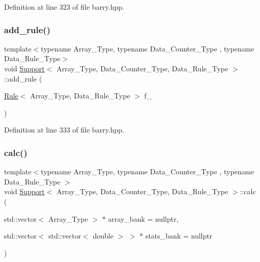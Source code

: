 Definition at line 323 of file barry.\+hpp.

\mbox{\label{classbarry_1_1_support_aa817cb5d6c48dda3ecfeef2c5897b537}} 
\subsubsection{\texorpdfstring{add\+\_\+rule()}{add\_rule()}\hspace{0.1cm}{\footnotesize\ttfamily [2/2]}}
{\footnotesize\ttfamily template$<$typename Array\+\_\+\+Type, typename Data\+\_\+\+Counter\+\_\+\+Type , typename Data\+\_\+\+Rule\+\_\+\+Type$>$ \\
void \hyperlink{classbarry_1_1_support}{Support}$<$ Array\+\_\+\+Type, Data\+\_\+\+Counter\+\_\+\+Type, Data\+\_\+\+Rule\+\_\+\+Type $>$\+::add\+\_\+rule (\begin{DoxyParamCaption}\item[{\hyperlink{classbarry_1_1_rule}{Rule}$<$ Array\+\_\+\+Type, Data\+\_\+\+Rule\+\_\+\+Type $>$}]{f\+\_\+ }\end{DoxyParamCaption})\hspace{0.3cm}{\ttfamily [inline]}}



Definition at line 333 of file barry.\+hpp.

\mbox{\label{classbarry_1_1_support_afa36b8c1348e28c51296379157f58081}} 
\subsubsection{\texorpdfstring{calc()}{calc()}}
{\footnotesize\ttfamily template$<$typename Array\+\_\+\+Type, typename Data\+\_\+\+Counter\+\_\+\+Type , typename Data\+\_\+\+Rule\+\_\+\+Type $>$ \\
void \hyperlink{classbarry_1_1_support}{Support}$<$ Array\+\_\+\+Type, Data\+\_\+\+Counter\+\_\+\+Type, Data\+\_\+\+Rule\+\_\+\+Type $>$\+::calc (\begin{DoxyParamCaption}\item[{std\+::vector$<$ Array\+\_\+\+Type $>$ $\ast$}]{array\+\_\+bank = {\ttfamily nullptr},  }\item[{std\+::vector$<$ std\+::vector$<$ double $>$ $>$ $\ast$}]{stats\+\_\+bank = {\ttfamily nullptr} }\end{DoxyParamCaption})\hspace{0.3cm}{\ttfamily [inline]}}



